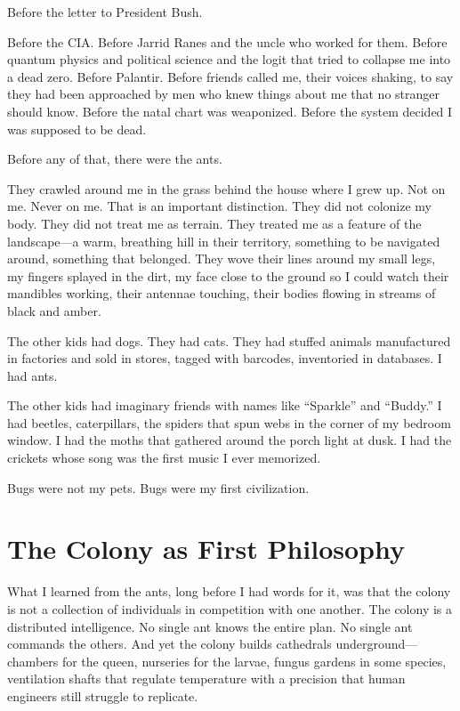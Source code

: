 \documentclass[11pt,openany]{book}
\begin{document}
Before the letter to President Bush.

Before the CIA. Before Jarrid Ranes and the uncle who worked for them. Before quantum physics and political science and the logit that tried to collapse me into a dead zero. Before Palantir. Before friends called me, their voices shaking, to say they had been approached by men who knew things about me that no stranger should know. Before the natal chart was weaponized. Before the system decided I was supposed to be dead.

Before any of that, there were the ants.

They crawled around me in the grass behind the house where I grew up. Not on me. Never on me. That is an important distinction. They did not colonize my body. They did not treat me as terrain. They treated me as a feature of the landscape---a warm, breathing hill in their territory, something to be navigated around, something that belonged. They wove their lines around my small legs, my fingers splayed in the dirt, my face close to the ground so I could watch their mandibles working, their antennae touching, their bodies flowing in streams of black and amber.

The other kids had dogs. They had cats. They had stuffed animals manufactured in factories and sold in stores, tagged with barcodes, inventoried in databases. I had ants.

The other kids had imaginary friends with names like ``Sparkle'' and ``Buddy.'' I had beetles, caterpillars, the spiders that spun webs in the corner of my bedroom window. I had the moths that gathered around the porch light at dusk. I had the crickets whose song was the first music I ever memorized.

Bugs were not my pets. Bugs were my first civilization.

\section*{The Colony as First Philosophy}

What I learned from the ants, long before I had words for it, was that the colony is not a collection of individuals in competition with one another. The colony is a distributed intelligence. No single ant knows the entire plan. No single ant commands the others. And yet the colony builds cathedrals underground---chambers for the queen, nurseries for the larvae, fungus gardens in some species, ventilation shafts that regulate temperature with a precision that human engineers still struggle to replicate.
\end{document}
